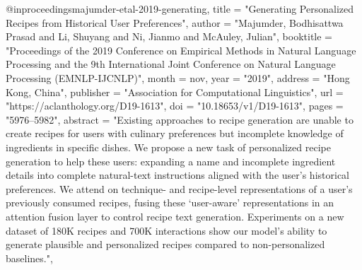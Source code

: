 


@inproceedings{majumder-etal-2019-generating,
    title = "Generating Personalized Recipes from Historical User Preferences",
    author = "Majumder, Bodhisattwa Prasad  and
      Li, Shuyang  and
      Ni, Jianmo  and
      McAuley, Julian",
    booktitle = "Proceedings of the 2019 Conference on Empirical Methods in Natural Language Processing and the 9th International Joint Conference on Natural Language Processing (EMNLP-IJCNLP)",
    month = nov,
    year = "2019",
    address = "Hong Kong, China",
    publisher = "Association for Computational Linguistics",
    url = "https://aclanthology.org/D19-1613",
    doi = "10.18653/v1/D19-1613",
    pages = "5976--5982",
    abstract = "Existing approaches to recipe generation are unable to create recipes for users with culinary preferences but incomplete knowledge of ingredients in specific dishes. We propose a new task of personalized recipe generation to help these users: expanding a name and incomplete ingredient details into complete natural-text instructions aligned with the user{'}s historical preferences. We attend on technique- and recipe-level representations of a user{'}s previously consumed recipes, fusing these {`}user-aware{'} representations in an attention fusion layer to control recipe text generation. Experiments on a new dataset of 180K recipes and 700K interactions show our model{'}s ability to generate plausible and personalized recipes compared to non-personalized baselines.",
}



